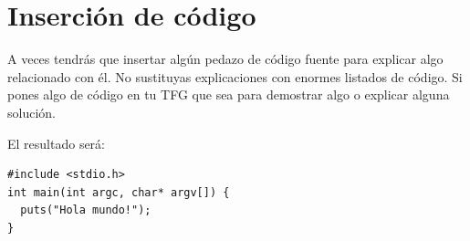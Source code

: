 \section{Inserción de código}
A veces tendrás que insertar algún pedazo de código fuente para explicar algo relacionado con él. No sustituyas explicaciones con enormes listados de código. Si pones algo de código en tu TFG que sea para demostrar algo o explicar alguna solución.

El resultado será:
\begin{lstlisting}[style=C, caption={ejemplo código C},label=C_code]
#include <stdio.h>
int main(int argc, char* argv[]) {
  puts("Hola mundo!");
}
\end{lstlisting}


